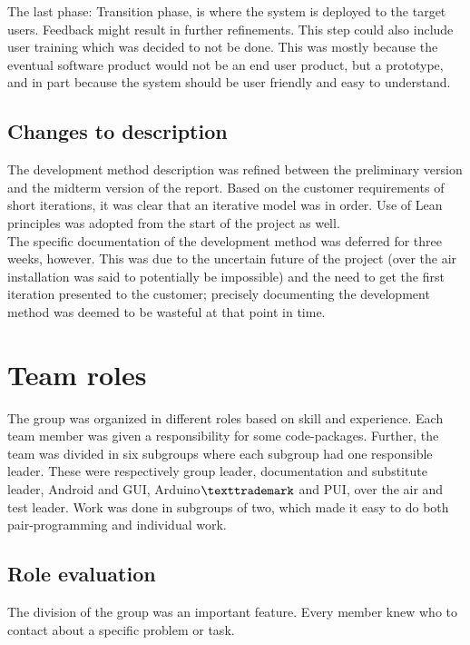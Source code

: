 The last phase: Transition phase, is where the system is deployed to the target users. Feedback might result in further refinements. This step could also include user training which was decided to not be done. This was mostly because the eventual software product would not be an end user product, but a prototype, and in part because the system should be user friendly and easy to understand.

\subsection{Changes to description}
The development method description was refined between the preliminary version and the midterm version of the report. Based on the customer requirements of short iterations, it was clear that an iterative model was in order. Use of Lean principles was adopted from the start of the project as well.\\
\newline
The specific documentation of the development method was deferred for three weeks, however. This was due to the uncertain future of the project (over the air installation was said to potentially be impossible) and the need to get the first iteration presented to the customer; precisely documenting the development method was deemed to be wasteful at that point in time.

\section{Team roles}
The group was organized in different roles based on skill and experience. Each team member was given a responsibility for some code-packages. Further, the team was divided in six subgroups where each subgroup had one responsible leader. These were respectively group leader, documentation and substitute leader, Android and GUI, Arduino$\texttrademark$ and PUI, over the air and test leader. Work was done in subgroups of two, which made it easy to do both pair-programming and individual work.

\subsection{Role evaluation}
The division of the group was an important feature. Every member knew who to contact about a specific problem or task.\\

